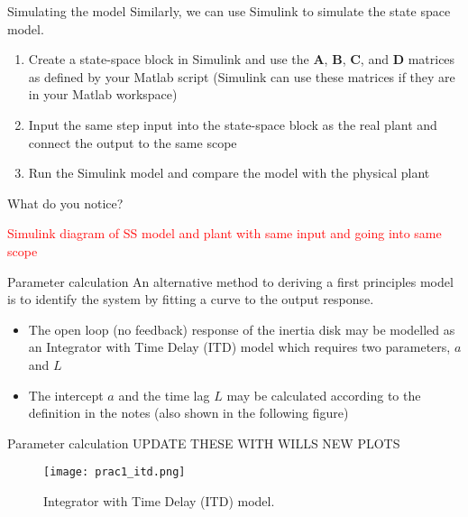 \documentclass[9pt]{beamer-control}
\begin{document}
\begin{frame}{Simulating the model}
Similarly, we can use Simulink to simulate the state space model.
\begin{enumerate}
	\item Create a state-space block in Simulink and use the $\mathbf{A}$, $\mathbf{B}$, $\mathbf{C}$, and $\mathbf{D}$ matrices as defined by your Matlab script (Simulink can use these matrices if they are in your Matlab workspace)
	\item Input the same step input into the state-space block as the real plant and connect the output to the same scope
	\item Run the Simulink model and compare the model with the physical plant
\end{enumerate}

What do you notice?


\textcolor{red}{Simulink diagram of SS model and plant with same input and going into same scope}

\end{frame}





\begin{frame}{Parameter calculation}
An alternative method to deriving a first principles model is to identify the system by fitting a curve to the output response. 

\begin{itemize}
	\item The open loop (no feedback) response of the inertia disk may be modelled as an Integrator with Time Delay (ITD) model which requires two parameters, $a$ and $L$
	\item The intercept $a$ and the time lag $L$ may be calculated according to the definition in the notes (also shown in the following figure)
\end{itemize}


\end{frame}

\begin{frame}{Parameter calculation}
	UPDATE THESE WITH WILLS NEW PLOTS
	\begin{figure}
		\centering
		\texttt{[image: prac1\_itd.png]}
		\caption{Integrator with Time Delay (ITD) model.}
	\end{figure}
\end{frame}
\end{document}
